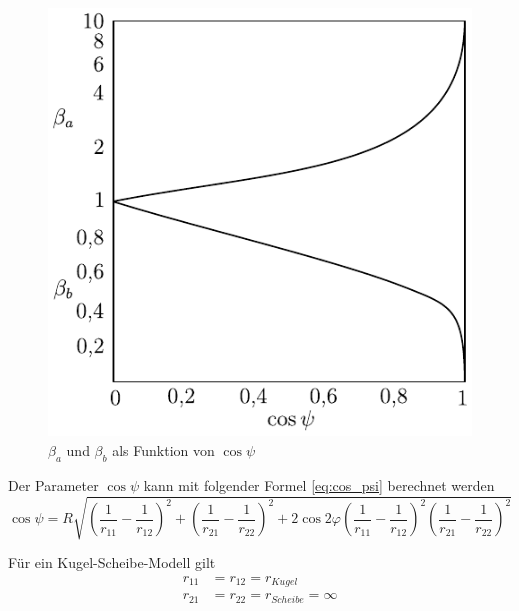 \begin{figure}[htb]
    \centering
    \includegraphics[]{./images/beta_cos_psi_diagram.pdf}
    \caption{$\beta_a$ und $\beta_b$ als Funktion von $\cos{\psi}$\cite{wisniewski_2000}}
    \label{fig:beta_a_und_beta_b_als_funktion_der_cos_psi}
\end{figure}
%

Der Parameter $\cos{\psi}$ kann mit folgender Formel \ref{eq:cos_psi} berechnet werden
\begin{equation}
    \label{eq:cos_psi}
    \cos{\psi} = R  \sqrt{\left( \frac{1}{r_{11}} - \frac{1}{r_{12}} \right)^2 
                                + \left( \frac{1}{r_{21}} - \frac{1}{r_{22}} \right)^2 
                                + 2  \cos{2 \varphi} 
                                 \left( \frac{1}{r_{11}} - \frac{1}{r_{12}}  \right)^2 
                                 \left( \frac{1}{r_{21}} - \frac{1}{r_{22}} \right)^2}
\end{equation}
%

Für ein Kugel-Scheibe-Modell gilt
%
\begin{align*}
    r_{11} &= r_{12} = r_{Kugel} \\
    r_{21} &= r_{22} = r_{Scheibe} = \infty
\end{align*}
%

